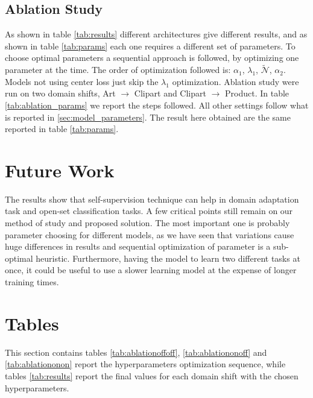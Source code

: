 \documentclass[10pt,twocolumn,letterpaper]{article}
\begin{document}
\subsection{Ablation Study}
\label{sec:ablation_study}
As shown in table \ref{tab:results} different architectures give different results, 
and as shown in table \ref{tab:params} each one requires a different set of parameters.
To choose optimal parameters a sequential approach is followed, 
by optimizing one parameter at the time.
The order of optimization followed is: 
$\alpha_1$, $\lambda_1$, $\mathcal{\tilde N}$, $\alpha_2$.
Models not using center loss just skip the $\lambda_1$ optimization.
Ablation study were run on two domain shifts, 
Art $\to$ Clipart and Clipart $\to$ Product.
In table \ref{tab:ablation_params} we report the steps followed.
All other settings follow what is reported in \ref{sec:model_parameters}.
The result here obtained are the same reported in table \ref{tab:params}.

\section{Future Work}
\label{sec:future_work}

The results show that self-supervision technique can help in domain adaptation task and open-set classification tasks.
A few critical points still remain on our method of study and proposed solution.
The most important one is probably parameter choosing for different models, as we have seen that variations cause huge differences in results and sequential optimization of parameter is a sub-optimal heuristic.
Furthermore, having the model to learn two different tasks at once, it could be useful to use a slower learning model at the expense of longer training times.

{\small


}


\newpage
\appendix
\section{Tables}
\label{sec:tables}

This section contains tables \ref{tab:ablationoffoff}, \ref{tab:ablationonoff} and \ref{tab:ablationonon} report the hyperparameters optimization sequence, while tables \ref{tab:results} report the final values for each domain shift with the chosen hyperparameters.
\end{document}
